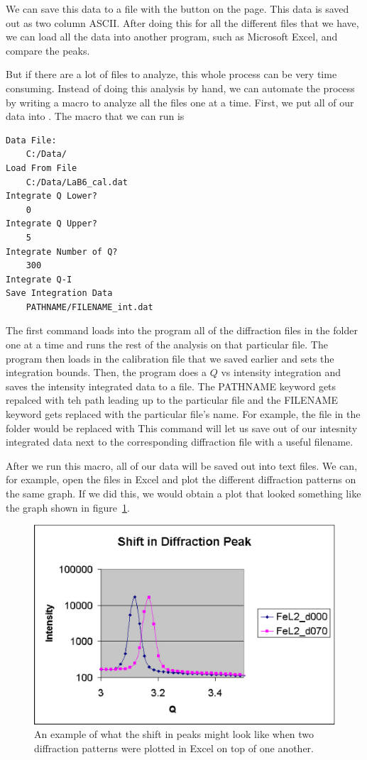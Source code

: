 We can save this data to a file with the 
button on the  page. This data is
saved out as two column ASCII.
After doing this for all the different files that
we have, we can load all the data into another program,
such as Microsoft Excel, and compare the peaks.

But if there are a lot of files to analyze, this whole
process can be very time consuming. Instead of doing 
this analysis by hand, we can automate the process by
writing a macro to analyze all the files one at a 
time. First, we put all of our data into .
The macro that we can run is
\begin{lstlisting}[caption={'A macro to automate the 
    analysis'}]
Data File:
	C:/Data/
Load From File
    C:/Data/LaB6_cal.dat
Integrate Q Lower?
	0
Integrate Q Upper?
	5
Integrate Number of Q?
	300
Integrate Q-I
Save Integration Data
    PATHNAME/FILENAME_int.dat
\end{lstlisting}
The first command loads into the program all of the
diffraction files in the folder 
one at a time and runs the rest of the analysis on
that particular file. The program then loads in
the calibration file that we saved earlier and sets the
integration bounds. Then, the program does a 
$Q$ vs intensity integration and saves the intensity
integrated data to a file. The PATHNAME keyword gets
repalced with teh path leading up to the particular 
file and the FILENAME keyword gets replaced with 
the particular file's name. For example, the file
 in
the folder  would
be replaced with
This command will let us save out of our intesnity
integrated data next to the corresponding diffraction
file with a useful filename.

After we run this macro, all of our data will 
be saved out into text files. We can, for
example, open the files in Excel and plot
the different diffraction patterns on the same
graph. If we did this, we would obtain a plot
that looked something like the graph shown
in figure~\ref{excel_peak_shift}.

\begin{figure}
    \centering
    \includegraphics[scale=.75]{figures/excel_peak_shift.eps}
    \caption{An example of what the shift in peaks might
    look like when two diffraction patterns were plotted
    in Excel on top of one another.}
    \label{excel_peak_shift}
\end{figure}


